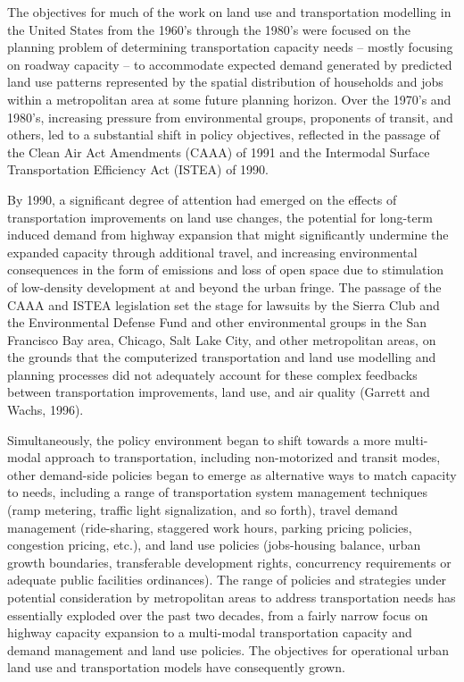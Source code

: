 The objectives for much of the work on land use and transportation modelling in the United States from the 1960's through the 1980's were focused on the planning problem of determining transportation capacity needs -- mostly focusing on roadway capacity -- to accommodate expected demand generated by predicted land use patterns represented by the spatial distribution of households and jobs within a metropolitan area at some future planning horizon.  Over the 1970's and 1980's, increasing pressure from environmental groups, proponents of transit, and others, led to a substantial shift in policy objectives, reflected in the passage of the Clean Air Act Amendments (CAAA) of 1991 and the Intermodal Surface Transportation Efficiency Act (ISTEA) of 1990.

By 1990, a significant degree of attention had emerged on the effects of transportation improvements on land use changes, the potential for long-term induced demand from highway expansion that might significantly undermine the expanded capacity through additional travel, and increasing environmental consequences in the form of emissions and loss of open space due to stimulation of low-density development at and beyond the urban fringe.  The passage of the CAAA and ISTEA legislation set the stage for lawsuits by the Sierra Club and the Environmental Defense Fund and other environmental groups in the San Francisco Bay area, Chicago, Salt Lake City, and other metropolitan areas, on the grounds that the computerized transportation and land use modelling and planning processes did not adequately account for these complex feedbacks between transportation improvements, land use, and air quality (Garrett and Wachs, 1996).

Simultaneously, the policy environment began to shift towards a more multi-modal approach to transportation, including non-motorized and transit modes, other demand-side policies began to emerge as alternative ways to match capacity to needs, including a range of transportation system management techniques (ramp metering, traffic light signalization, and so forth), travel demand management (ride-sharing, staggered work hours, parking pricing policies, congestion pricing, etc.), and land use policies (jobs-housing balance, urban growth boundaries, transferable development rights, concurrency requirements or adequate public facilities ordinances).  The range of policies and strategies under potential consideration by metropolitan areas to address transportation needs has essentially exploded over the past two decades, from a fairly narrow focus on highway capacity expansion to a multi-modal transportation capacity and demand management and land use policies.  The objectives for operational urban land use and transportation models have consequently grown.

